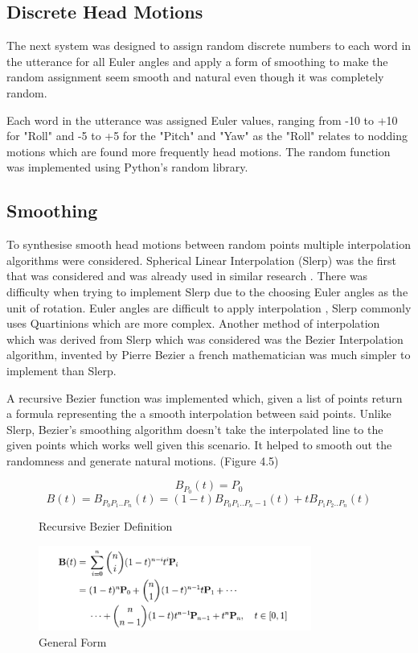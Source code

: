 \documentclass[bsc,frontabs,twoside,singlespacing,parskip]{infthesis}
\begin{document}
\subsection{Discrete Head Motions}

The next system was designed to assign random discrete numbers to each word in the utterance for all Euler angles and apply a form of smoothing to make the random assignment seem smooth and natural even though it was completely random. 

Each word in the utterance was assigned Euler values, ranging from -10 to +10 for "Roll" and -5 to +5 for the "Pitch" and "Yaw" as the "Roll" relates to nodding motions which are found more frequently head motions. The random function was implemented using Python's random library.

\subsection{Smoothing}

To synthesise smooth head motions between random points multiple interpolation algorithms were considered. Spherical Linear Interpolation (Slerp) was the first that was considered and was already used in similar research \cite{rigid_head_motion}. There was difficulty when trying to implement Slerp due to the choosing Euler angles as the unit of rotation. Euler angles are difficult to apply interpolation \cite{quartionions}, Slerp commonly uses Quartinions which are more complex. Another method of interpolation which was derived from Slerp which was considered was the Bezier Interpolation algorithm, invented by Pierre Bezier a french mathematician was much simpler to implement than Slerp.

A recursive Bezier function was implemented which, given a list of points return a formula representing the a smooth interpolation between said points. Unlike Slerp, Bezier's smoothing algorithm doesn't take the interpolated line to the given points which works well given this scenario. It helped to smooth out the randomness and generate natural motions. (Figure 4.5)

\begin{figure}
	$$ B_{P_0}(t) = P_0 $$
	$$ B(t) = B_{P_0P_1..P_n}(t) = (1-t) B_{P_0P_1..P_n-1}(t) + tB_{P_1P_2..P_n} (t)$$
	\caption{Recursive Bezier Definition} 
	\centering
	\includegraphics[width=0.8\textwidth]{bezier_general.png}
	\caption{General Form}
\end{figure}
\end{document}
